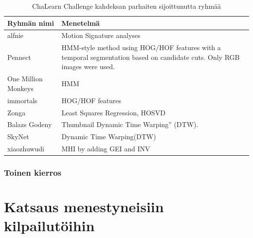 \begin{table}[th]
\caption{ChaLearn Challenge kahdeksan parhaiten sijoittunutta ryhmää}
\label{table:dvbt_param}
\begin{center}
\begin{tabular}{|p{}|p{}|} 
    \hline
Ryhmän nimi & Menetelmä \\
    \hline
    \hline
alfnie & Motion Signature analyses\\ 
    \hline
Pennect & HMM-style method using HOG/HOF features
with a temporal segmentation based on candidate cuts.
Only RGB images were used.\\
    \hline
One Million Monkeys & HMM\\
    \hline
immortals & HOG/HOF features\\
    \hline
Zonga & Least Squares Regression, HOSVD\\
    \hline
Balazs Godeny & Thumbnail Dynamic Time Warping” (DTW).\\
    \hline
SkyNet & Dynamic Time Warping(DTW)\\
    \hline
xiaozhuwudi & MHI by adding GEI and INV\\
    \hline	
\end{tabular}
\end{center}
\end{table}

\subsubsection {Toinen kierros}
\newpage
\section {Katsaus menestyneisiin kilpailutöihin}

